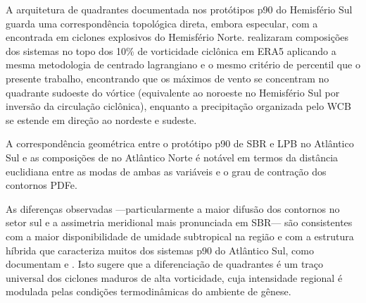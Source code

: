 
A arquitetura de quadrantes documentada nos protótipos p90 do Hemisfério Sul guarda uma correspondência topológica direta, embora especular, com a encontrada em ciclones explosivos do Hemisfério Norte. \citet{priestley2022improved} realizaram composições dos sistemas no topo dos 10\% de vorticidade ciclônica em ERA5 aplicando a mesma metodologia de centrado lagrangiano e o mesmo critério de percentil que o presente trabalho, encontrando que os máximos de vento se concentram no quadrante sudoeste do vórtice (equivalente ao noroeste no Hemisfério Sul por inversão da circulação ciclônica), enquanto a precipitação organizada pelo WCB se estende em direção ao nordeste e sudeste.

A correspondência geométrica entre o protótipo p90 de SBR e LPB no Atlântico Sul e as composições de \citet{priestley2022improved} no Atlântico Norte é notável em termos da distância euclidiana entre as modas de ambas as variáveis e o grau de contração dos contornos PDFe.

As diferenças observadas —particularmente a maior difusão dos contornos no setor sul e a assimetria meridional mais pronunciada em SBR— são consistentes com a maior disponibilidade de umidade subtropical na região e com a estrutura híbrida que caracteriza muitos dos sistemas p90 do Atlântico Sul, como documentam \citet{evans2012climatology} e \citet{gozzo2014subtropical}. Isto sugere que a diferenciação de quadrantes é um traço universal dos ciclones maduros de alta vorticidade, cuja intensidade regional é modulada pelas condições termodinâmicas do ambiente de gênese.


